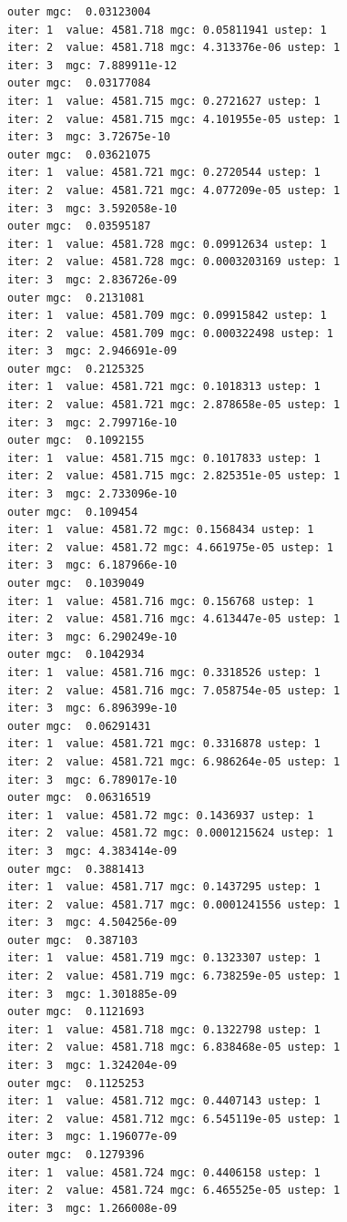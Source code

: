 \documentclass[
  letterpaper,
  DIV=11,
  numbers=noendperiod]{scrartcl}
\begin{document}
\begin{verbatim}
outer mgc:  0.03123004 
iter: 1  value: 4581.718 mgc: 0.05811941 ustep: 1 
iter: 2  value: 4581.718 mgc: 4.313376e-06 ustep: 1 
iter: 3  mgc: 7.889911e-12 
outer mgc:  0.03177084 
iter: 1  value: 4581.715 mgc: 0.2721627 ustep: 1 
iter: 2  value: 4581.715 mgc: 4.101955e-05 ustep: 1 
iter: 3  mgc: 3.72675e-10 
outer mgc:  0.03621075 
iter: 1  value: 4581.721 mgc: 0.2720544 ustep: 1 
iter: 2  value: 4581.721 mgc: 4.077209e-05 ustep: 1 
iter: 3  mgc: 3.592058e-10 
outer mgc:  0.03595187 
iter: 1  value: 4581.728 mgc: 0.09912634 ustep: 1 
iter: 2  value: 4581.728 mgc: 0.0003203169 ustep: 1 
iter: 3  mgc: 2.836726e-09 
outer mgc:  0.2131081 
iter: 1  value: 4581.709 mgc: 0.09915842 ustep: 1 
iter: 2  value: 4581.709 mgc: 0.000322498 ustep: 1 
iter: 3  mgc: 2.946691e-09 
outer mgc:  0.2125325 
iter: 1  value: 4581.721 mgc: 0.1018313 ustep: 1 
iter: 2  value: 4581.721 mgc: 2.878658e-05 ustep: 1 
iter: 3  mgc: 2.799716e-10 
outer mgc:  0.1092155 
iter: 1  value: 4581.715 mgc: 0.1017833 ustep: 1 
iter: 2  value: 4581.715 mgc: 2.825351e-05 ustep: 1 
iter: 3  mgc: 2.733096e-10 
outer mgc:  0.109454 
iter: 1  value: 4581.72 mgc: 0.1568434 ustep: 1 
iter: 2  value: 4581.72 mgc: 4.661975e-05 ustep: 1 
iter: 3  mgc: 6.187966e-10 
outer mgc:  0.1039049 
iter: 1  value: 4581.716 mgc: 0.156768 ustep: 1 
iter: 2  value: 4581.716 mgc: 4.613447e-05 ustep: 1 
iter: 3  mgc: 6.290249e-10 
outer mgc:  0.1042934 
iter: 1  value: 4581.716 mgc: 0.3318526 ustep: 1 
iter: 2  value: 4581.716 mgc: 7.058754e-05 ustep: 1 
iter: 3  mgc: 6.896399e-10 
outer mgc:  0.06291431 
iter: 1  value: 4581.721 mgc: 0.3316878 ustep: 1 
iter: 2  value: 4581.721 mgc: 6.986264e-05 ustep: 1 
iter: 3  mgc: 6.789017e-10 
outer mgc:  0.06316519 
iter: 1  value: 4581.72 mgc: 0.1436937 ustep: 1 
iter: 2  value: 4581.72 mgc: 0.0001215624 ustep: 1 
iter: 3  mgc: 4.383414e-09 
outer mgc:  0.3881413 
iter: 1  value: 4581.717 mgc: 0.1437295 ustep: 1 
iter: 2  value: 4581.717 mgc: 0.0001241556 ustep: 1 
iter: 3  mgc: 4.504256e-09 
outer mgc:  0.387103 
iter: 1  value: 4581.719 mgc: 0.1323307 ustep: 1 
iter: 2  value: 4581.719 mgc: 6.738259e-05 ustep: 1 
iter: 3  mgc: 1.301885e-09 
outer mgc:  0.1121693 
iter: 1  value: 4581.718 mgc: 0.1322798 ustep: 1 
iter: 2  value: 4581.718 mgc: 6.838468e-05 ustep: 1 
iter: 3  mgc: 1.324204e-09 
outer mgc:  0.1125253 
iter: 1  value: 4581.712 mgc: 0.4407143 ustep: 1 
iter: 2  value: 4581.712 mgc: 6.545119e-05 ustep: 1 
iter: 3  mgc: 1.196077e-09 
outer mgc:  0.1279396 
iter: 1  value: 4581.724 mgc: 0.4406158 ustep: 1 
iter: 2  value: 4581.724 mgc: 6.465525e-05 ustep: 1 
iter: 3  mgc: 1.266008e-09 

\end{verbatim}
\end{document}

